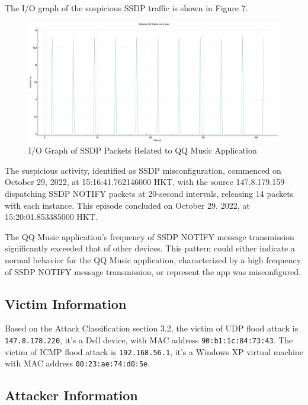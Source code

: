 \documentclass{article}
\begin{document}
    The I/O graph of the suspicious SSDP traffic is shown in Figure 7.

    \begin{figure}[H]
        \centering
        \includegraphics[width=\textwidth]{image/159_ssdp.png}
        \caption{I/O Graph of SSDP Packets Related to QQ Music Application}
        \label{fig:ssdp-flood-io-graph}
    \end{figure}

    The suspicious activity, identified as SSDP misconfiguration, 
    commenced on October 29, 2022, at 15:16:41.762146000 HKT, 
    with the source 147.8.179.159 dispatching SSDP NOTIFY packets at 20-second intervals, 
    releasing 14 packets with each instance. 
    This episode concluded on October 29, 2022, at 15:20:01.853385000 HKT.
 
    The QQ Music application's frequency of SSDP NOTIFY message transmission significantly exceeded that of other devices. 
    This pattern could either indicate a normal behavior for the QQ Music application, 
    characterized by a high frequency of SSDP NOTIFY message transmission, or represent the app was misconfigured.

    \subsection{Victim Information}\label{subsec:victim-information}
    
    Based on the Attack Classification section 3.2, 
    the victim of UDP flood attack is \lstinline|147.8.178.220|, it's a Dell device, with MAC address \lstinline|90:b1:1c:84:73:43|.
    The victim of ICMP flood attack is \lstinline|192.168.56.1|, it's a Windows XP virtual machine with MAC address \lstinline|00:23:ae:74:d0:5e|.

    \subsection{Attacker Information}\label{subsec:attacker-information}
\end{document}
